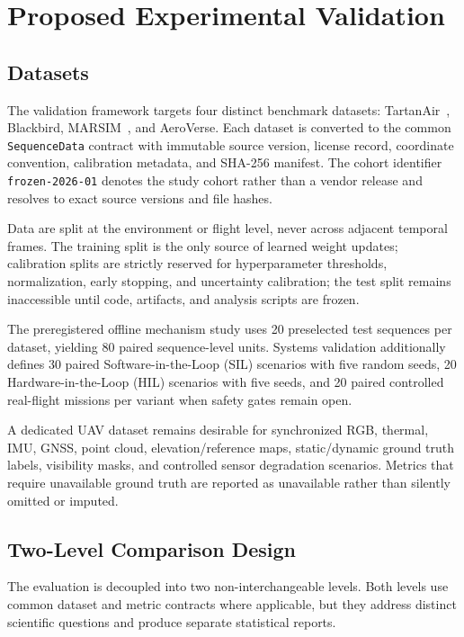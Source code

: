 \section{Proposed Experimental Validation}
\label{sec:experiments}

\subsection{Datasets}
\label{subsec:datasets}

The validation framework targets four distinct benchmark datasets: TartanAir~\cite{wang2020tartanair}, Blackbird, MARSIM~\cite{kong2023marsim}, and AeroVerse. Each dataset is converted to the common \texttt{SequenceData} contract with immutable source version, license record, coordinate convention, calibration metadata, and SHA-256 manifest. The cohort identifier \texttt{frozen-2026-01} denotes the study cohort rather than a vendor release and resolves to exact source versions and file hashes.

Data are split at the environment or flight level, never across adjacent temporal frames. The training split is the only source of learned weight updates; calibration splits are strictly reserved for hyperparameter thresholds, normalization, early stopping, and uncertainty calibration; the test split remains inaccessible until code, artifacts, and analysis scripts are frozen.

The preregistered offline mechanism study uses 20 preselected test sequences per dataset, yielding 80 paired sequence-level units. Systems validation additionally defines 30 paired Software-in-the-Loop (SIL) scenarios with five random seeds, 20 Hardware-in-the-Loop (HIL) scenarios with five seeds, and 20 paired controlled real-flight missions per variant when safety gates remain open.

A dedicated UAV dataset remains desirable for synchronized RGB, thermal, IMU, GNSS, point cloud, elevation/reference maps, static/dynamic ground truth labels, visibility masks, and controlled sensor degradation scenarios. Metrics that require unavailable ground truth are reported as unavailable rather than silently omitted or imputed.

\subsection{Two-Level Comparison Design}
\label{subsec:comparison_design}

The evaluation is decoupled into two non-interchangeable levels. Both levels use common dataset and metric contracts where applicable, but they address distinct scientific questions and produce separate statistical reports.

